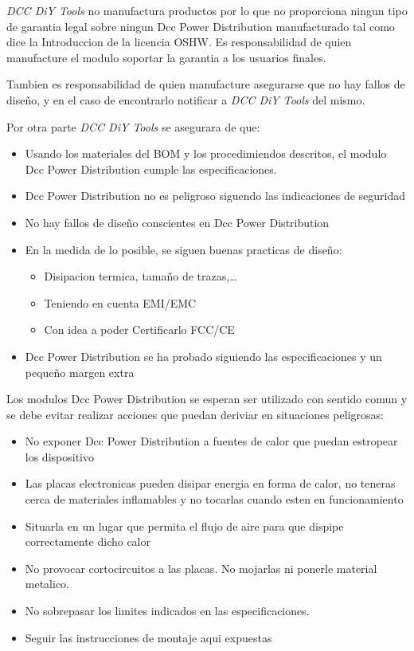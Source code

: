 \textit{DCC DiY Tools} no manufactura productos por lo que no proporciona ningun
tipo de garantia legal sobre ningun Dcc Power Distribution manufacturado tal como dice la Introduccion
de la licencia OSHW. Es responsabilidad de quien manufacture el modulo soportar
la garantia a los usuarios finales.

Tambien es responsabilidad de quien manufacture asegurarse que no hay fallos de diseño,
y en el caso de encontrarlo notificar a \textit{DCC DiY Tools} del mismo.

Por otra parte \textit{DCC DiY Tools} se asegurara de que:
\begin{itemize}
    \item Usando los materiales del BOM y los procedimiendos descritos, el modulo
    Dcc Power Distribution cumple las especificaciones.
    \item Dcc Power Distribution no es peligroso siguendo las indicaciones de seguridad
    \item No hay fallos de diseño conscientes en Dcc Power Distribution
    \item En la medida de lo posible, se siguen buenas practicas de diseño:
    \begin{itemize}
        \item Disipacion termica, tamaño de trazas,\dots
        \item Teniendo en cuenta EMI/EMC
        \item Con idea a poder Certificarlo FCC/CE
    \end{itemize}
    \item Dcc Power Distribution se ha probado siguiendo las especificaciones y un pequeño margen extra
\end{itemize} 

Los modulos Dcc Power Distribution se esperan ser utilizado con sentido comun y se
debe evitar realizar acciones que puedan deriviar en situaciones peligrosas:
\begin{itemize}
    \item No exponer Dcc Power Distribution a fuentes de calor que puedan estropear los dispositivo
    \item Las placas electronicas pueden disipar energia en forma de calor, no
    teneras cerca de materiales inflamables y no tocarlas cuando esten en funcionamiento
    \item Situarla en un lugar que permita el flujo de aire para que dispipe
    correctamente dicho calor
    \item No provocar cortocircuitos a las placas. No mojarlas ni ponerle material metalico.
    \item No sobrepasar los limites indicados en las especificaciones.
	\item Seguir las instrucciones de montaje aqui expuestas
\end{itemize}